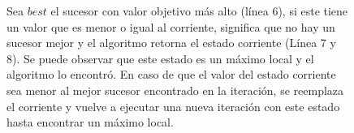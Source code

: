 \begin{figure}[H]
Sea $best$ el sucesor con valor objetivo más alto (línea 6), si este tiene un valor que es menor o igual al corriente, significa que no hay un sucesor mejor y el algoritmo retorna el estado corriente (Línea 7 y 8). Se puede observar que este estado es un máximo local y el algoritmo lo encontró.
En caso de que el valor del estado corriente sea menor al mejor sucesor encontrado en la iteración, se reemplaza el corriente y vuelve a ejecutar una nueva iteración con este estado hasta encontrar un máximo local. 




\end{figure}
